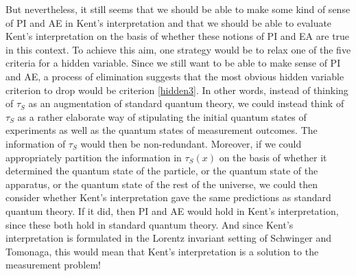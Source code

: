 But nevertheless, it still seems that we should be able to make some kind of sense of PI and AE in Kent's interpretation and that we should be able to evaluate Kent's interpretation on the basis of whether these notions of PI and EA are true in this context. To achieve this aim, one strategy would be to relax one of the five criteria for a hidden variable. Since we still want to be able to make sense of PI and AE,  a process of elimination suggests that the most obvious hidden variable criterion to drop would be criterion \ref{hidden3}. In other words, instead of thinking of $\tau_S$ as an augmentation of standard quantum theory, we could instead think of $\tau_S$ as a rather elaborate way of stipulating the initial quantum states of experiments as well as the quantum states of measurement outcomes. The information of $\tau_S$ would then be non-redundant. Moreover, if we could appropriately partition the information in $\tau_S(x)$ on the basis of whether it determined the quantum state of the particle, or the quantum state of the apparatus, or the quantum state of the rest of the universe, we could then consider whether Kent's interpretation gave the same predictions as standard quantum theory. If it did, then PI and AE would hold in Kent's interpretation, since these both hold in standard quantum theory. And since Kent's interpretation is formulated in the Lorentz invariant setting of Schwinger and Tomonaga, this would mean that Kent's interpretation is a solution to the measurement problem!
